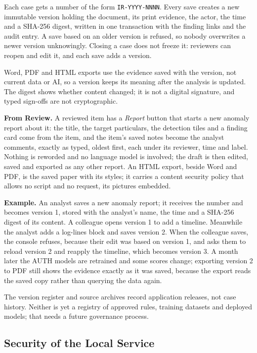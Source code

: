 \documentclass[11pt,a4paper]{article}
\newcommand{\tok}[1]{\texttt{\detokenize{#1}}}
\begin{document}
Each case gets a number of the form \nolinkurl{IR-YYYY-NNNN}. Every save creates a new immutable version holding the document, its print evidence, the actor, the time and a SHA-256 digest, written in one transaction with the finding links and the audit entry. A save based on an older version is refused, so nobody overwrites a newer version unknowingly. Closing a case does not freeze it: reviewers can reopen and edit it, and each save adds a version.

Word, PDF and HTML exports use the evidence saved with the version, not current data or AI, so a version keeps its meaning after the analysis is updated. The digest shows whether content changed; it is not a digital signature, and typed sign-offs are not cryptographic.

\textbf{From Review.} A reviewed item has a \emph{Report} button that starts a new anomaly report about it: the title, the target particulars, the detection tiles and a finding card come from the item, and the item's saved notes become the analyst comments, exactly as typed, oldest first, each under its reviewer, time and label. Nothing is reworded and no language model is involved; the draft is then edited, saved and exported as any other report. An HTML export, beside Word and PDF, is the saved paper with its styles; it carries a content security policy that allows no script and no request, its pictures embedded.

\textbf{Example.} An analyst saves a new anomaly report; it receives the number \tok{IR-2026-0007} and becomes version 1, stored with the analyst's name, the time and a SHA-256 digest of its content. A colleague opens version 1 to add a timeline. Meanwhile the analyst adds a log-lines block and saves version 2. When the colleague saves, the console refuses, because their edit was based on version 1, and asks them to reload version 2 and reapply the timeline, which becomes version 3. A month later the AUTH models are retrained and some scores change; exporting version 2 to PDF still shows the evidence exactly as it was saved, because the export reads the saved copy rather than querying the data again.

The version register and source archives record application releases, not case history. Neither is yet a registry of approved rules, training datasets and deployed models; that needs a future governance process.

\subsection{Security of the Local Service}\label{sec:security}
\end{document}
